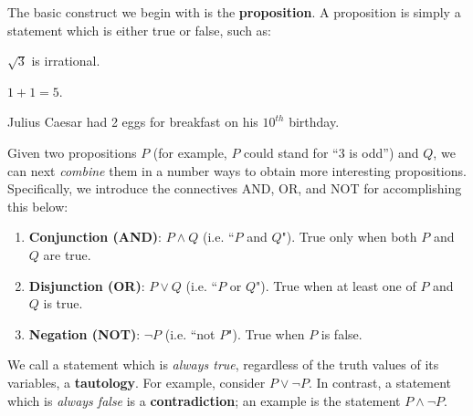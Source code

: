\documentclass[11pt]{article}
\begin{document}
The basic construct we begin with is the \textbf{proposition}. A proposition is simply a statement which is either true or false, such as:
\begin{compactitem}
    \item $\sqrt{3}$ is irrational.
    \item $1+1=5$.
    \item Julius Caesar had 2 eggs for breakfast on his $10^{th}$ birthday.
\end{compactitem}

Given two propositions $P$ (for example, $P$ could stand for ``3 is odd'') and $Q$, we can next \emph{combine} them in a number ways to obtain more interesting propositions. Specifically, we introduce the connectives AND, OR, and NOT for accomplishing this below:
\begin{enumerate}
 \item \textbf{Conjunction (AND)}: $P \wedge Q$ (i.e. ``$P$ and $Q$").  True only when both $P$ and $Q$ are true.
 \item \textbf{Disjunction (OR)}: $P \vee Q$ (i.e. ``$P$ or $Q$").  True when at least one of $P$ and $Q$ is true.
 \item \textbf{Negation (NOT)}: $\lnot P$ (i.e. ``not $P$").  True when $P$ is false.
\end{enumerate}

We call a statement which is \emph{always true}, regardless of the truth values of its variables, a  \textbf{tautology}. For example, consider $P\vee \neg P$. In contrast, a statement which is \emph{always false} is a \textbf{contradiction}; an example is the statement $P \wedge \neg P$.

\end{document}
